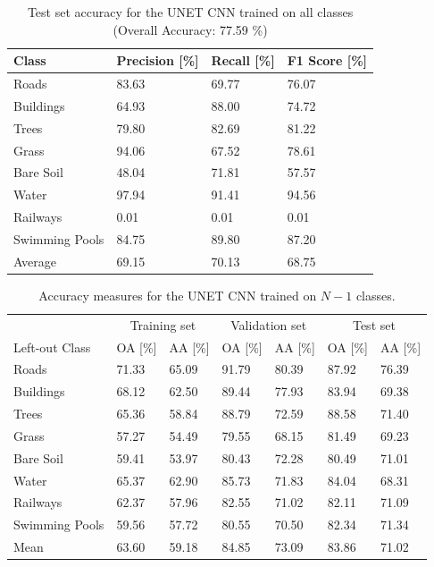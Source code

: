 \documentclass[10pt]{article}
\begin{document}
\begin{table}[H]
    \centering
    \begin{tabular}{llll}
    \toprule
    Class            & Precision [\%] & Recall [\%] & F1 Score [\%] \\ \midrule
    Roads          &      83.63 &   69.77 &     76.07 \\
    Buildings      &      64.93 &   88.00 &     74.72 \\
    Trees          &      79.80 &   82.69 &     81.22 \\
    Grass          &      94.06 &   67.52 &     78.61 \\
    Bare Soil      &      48.04 &   71.81 &     57.57 \\
    Water          &      97.94 &   91.41 &     94.56 \\
    Railways       &       0.01 &    0.01 &      0.01 \\
    Swimming Pools &      84.75 &   89.80 &     87.20 \\ \midrule
    Average        & 69.15     & 70.13  & 68.75  \\ \bottomrule
    \end{tabular}
    \caption{Test set accuracy for the UNET \gls{CNN} trained on all classes (Overall Accuracy:  77.59 \%)}
    \label{table:zurich-cnn-acc-all}
\end{table}

\begin{table}[H]
    \centering
    \begin{tabular}{lllllll}
    \toprule
                     & \multicolumn{2}{c}{Training set} & \multicolumn{2}{c}{Validation set} & \multicolumn{2}{c}{Test set}\\
    Left-out Class   & OA [\%]  & AA [\%] & OA [\%]  & AA [\%] & OA [\%]  & AA [\%]\\\midrule
    Roads          &     71.33 &     65.09 &   91.79 &   80.39 &    87.92 &    76.39 \\
    Buildings      &     68.12 &     62.50 &   89.44 &   77.93 &    83.94 &    69.38 \\
    Trees          &     65.36 &     58.84 &   88.79 &   72.59 &    88.58 &    71.40 \\
    Grass          &     57.27 &     54.49 &   79.55 &   68.15 &    81.49 &    69.23 \\
    Bare Soil      &     59.41 &     53.97 &   80.43 &   72.28 &    80.49 &    71.01 \\
    Water          &     65.37 &     62.90 &   85.73 &   71.83 &    84.04 &    68.31 \\
    Railways       &     62.37 &     57.96 &   82.55 &   71.02 &    82.11 &    71.09 \\
    Swimming Pools &     59.56 &     57.72 &   80.55 &   70.50 &    82.34 &    71.34 \\\midrule
    Mean           &  63.60 &  59.18 &  84.85 &  73.09 &  83.86 &  71.02 \\\bottomrule
    \end{tabular}
    \caption{Accuracy measures for the UNET \gls{CNN} trained on $N-1$ classes.}
    \label{table:zurich-cnn-acc-nd}
\end{table}
\end{document}
